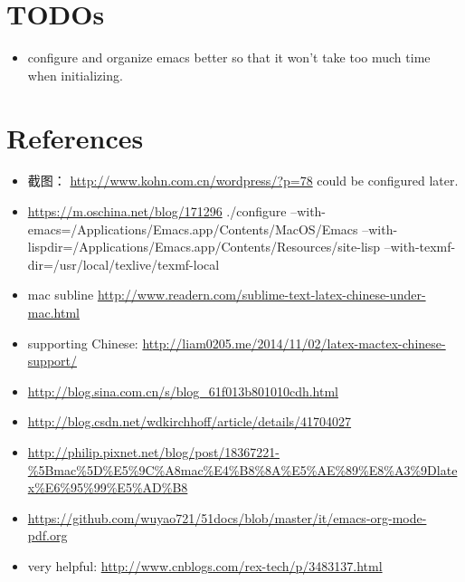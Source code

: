 \documentclass[9pt,b5paper]{article}
\begin{document}
\section{TODOs}
\label{sec-2}
\begin{itemize}
\item configure and organize emacs better so that it won't take too much time when initializing.
\end{itemize}

\section{References}
\label{sec-3}
\begin{itemize}
\item 截图： \url{http://www.kohn.com.cn/wordpress/?p=78} could be configured later.
\item \url{https://m.oschina.net/blog/171296} ./configure --with-emacs=/Applications/Emacs.app/Contents/MacOS/Emacs --with-lispdir=/Applications/Emacs.app/Contents/Resources/site-lisp --with-texmf-dir=/usr/local/texlive/texmf-local
\item mac subline \url{http://www.readern.com/sublime-text-latex-chinese-under-mac.html}
\item supporting Chinese: \url{http://liam0205.me/2014/11/02/latex-mactex-chinese-support/}
\item \url{http://blog.sina.com.cn/s/blog_61f013b801010cdh.html}
\item \url{http://blog.csdn.net/wdkirchhoff/article/details/41704027}
\item \url{http://philip.pixnet.net/blog/post/18367221-\%5Bmac\%5D\%E5\%9C\%A8mac\%E4\%B8\%8A\%E5\%AE\%89\%E8\%A3\%9Dlatex\%E6\%95\%99\%E5\%AD\%B8}
\item \url{https://github.com/wuyao721/51docs/blob/master/it/emacs-org-mode-pdf.org}
\item very helpful: \url{http://www.cnblogs.com/rex-tech/p/3483137.html}
\end{itemize}
\end{document}
